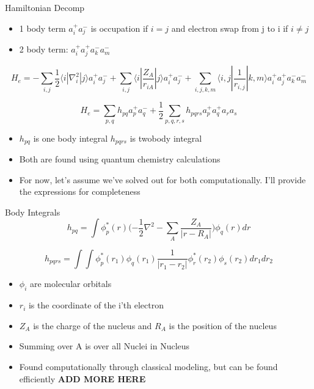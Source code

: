 \begin{frame}{Hamiltonian Decomp}
    \begin{itemize}
        \item 1 body term $a_i^+a_j^-$ is occupation if $i=j$ and electron swap from j to i if $i\neq j$
        \item 2 body term: $a_i^+a_j^+a_k^-a_m^-$
    \end{itemize}
    \begin{equation}
        H_e = -\sum_{i,j}{\frac{1}{2}\langle i | \nabla_i^2 | j \rangle a_i^+a_j^-} + \sum_{i,j}{\langle i | \frac{Z_A}{r_{iA}}| j \rangle a_i^+a_j^- } + \sum_{i,j,k,m}{\langle i,j | \frac{1}{r_{i,j}}| k,m \rangle a_i^+a_j^+a_k^-a_m^-}
    \end{equation}

    \begin{equation}
        H_e = \sum_{p,q}h_{pq}a_p^+a_q^- + \frac{1}{2} \sum_{p,q,r,s}{h_{pqrs}a_p^+a_q^+a_ra_s}
    \end{equation}

    \begin{itemize}
        \item $h_{pq}$ is one body integral $h_{pqrs}$ is twobody integral
        \item Both are found using quantum chemistry calculations
        \item For now, let's assume we've solved out for both computationally. I'll provide the expressions for completeness
    \end{itemize}
    
\end{frame}
\begin{frame}{Body Integrals}
\begin{equation}
    h_{pq} = \int \phi_p^*(r)(-\frac{1}{2} \nabla^2 - \sum_A{\frac{Z_A}{|r-R_A|})\phi_q(r)dr}
\end{equation}

\begin{equation}
    h_{pqrs} = \int{\int{\phi_p^*(r_1)}\phi_q(r_1)\frac{1}{|r_1-r_2|}\phi_r^*(r_2)\phi_s(r_2)dr_1dr_2}
\end{equation}

\begin{itemize}
    \item $\phi_i$ are molecular orbitals
    \item $r_i$ is the coordinate of the i'th electron
    \item $Z_A$ is the charge of the nucleus and $R_A$ is the position of the nucleus
    \item Summing over A is over all Nuclei in Nucleus
    \item Found computationally through classical modeling, but can be found efficiently \textbf{ADD MORE HERE}
\end{itemize}
    
\end{frame}
